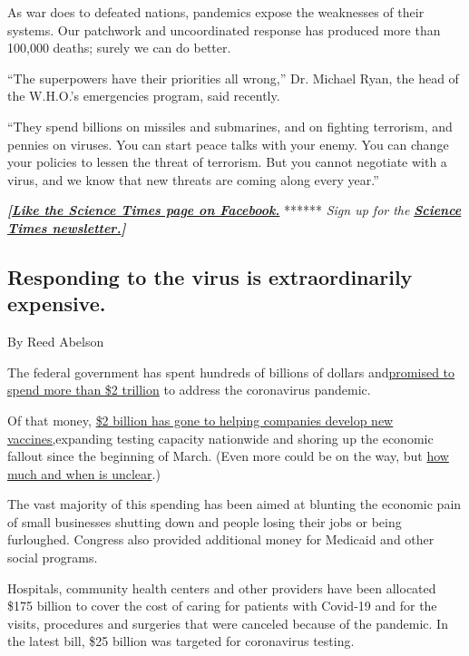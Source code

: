 As war does to defeated nations, pandemics expose the weaknesses of
their systems. Our patchwork and uncoordinated response has produced
more than 100,000 deaths; surely we can do better.

``The superpowers have their priorities all wrong,'' Dr. Michael Ryan,
the head of the W.H.O.'s emergencies program, said recently.

``They spend billions on missiles and submarines, and on fighting
terrorism, and pennies on viruses. You can start peace talks with your
enemy. You can change your policies to lessen the threat of terrorism.
But you cannot negotiate with a virus, and we know that new threats are
coming along every year.''

\textbf{\emph{{[}}\href{http://on.fb.me/1paTQ1h}{\emph{Like the Science
Times page on Facebook.}}} ****** \emph{\textbar{} Sign up for the}
\textbf{\href{http://nyti.ms/1MbHaRU}{\emph{Science Times
newsletter.}}\emph{{]}}}

\hypertarget{responding-to-the-virus-is-extraordinarily-expensive}{%
\subsection{Responding to the virus is extraordinarily
expensive.}\label{responding-to-the-virus-is-extraordinarily-expensive}}

By Reed Abelson

The federal government has spent hundreds of billions of dollars
and\href{https://www.nytimes3xbfgragh.onion/2020/04/24/business/congress-coronavirus-stimulus-bill.html}{promised
to spend more than \$2 trillion} to address the coronavirus pandemic.

Of that money,
\href{https://www.nytimes3xbfgragh.onion/2020/05/21/health/coronavirus-vaccine-astrazeneca.html}{\$2
billion has gone to helping companies develop new vaccines,}expanding
testing capacity nationwide and shoring up the economic fallout since
the beginning of March. (Even more could be on the way, but
\href{https://www.nytimes3xbfgragh.onion/2020/05/15/us/politics/house-simulus-vote.html}{how
much and when is unclear}.)

The vast majority of this spending has been aimed at blunting the
economic pain of small businesses shutting down and people losing their
jobs or being furloughed. Congress also provided additional money for
Medicaid and other social programs.

Hospitals, community health centers and other providers have been
allocated \$175 billion to cover the cost of caring for patients with
Covid-19 and for the visits, procedures and surgeries that were canceled
because of the pandemic. In the latest bill, \$25 billion was targeted
for coronavirus testing.

